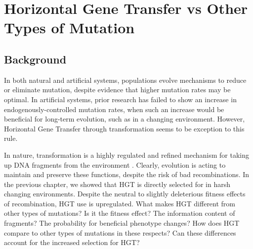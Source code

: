 \documentclass[PhD]{msu-thesis}
\begin{document}
\chapter{Horizontal Gene Transfer vs Other Types of Mutation}
\label{chap:hgt-preferred}
\section{Background}

In both natural and artificial systems, populations evolve mechanisms to reduce or eliminate mutation\cite{wielgoss_mutation_2013}, despite evidence that higher mutation rates may be optimal\cite{clune_natural_2008}.
In artificial systems, prior research has failed to show an increase in endogenously-controlled mutation rates, when such an increase would be beneficial for long-term evolution, such as in a changing environment\cite{clune_natural_2008}. However, Horizontal Gene Transfer through transformation seems to be exception to this rule.  

In nature, transformation is a highly regulated and refined mechanism for taking up DNA fragments from the environment \cite{solomon_whos_1996,seitz_cues_2013,fontaine_novel_2010}. 
Clearly, evolution
is acting to maintain and preserve these functions, despite the risk of bad recombinations. In the previous chapter, we showed that HGT is directly selected for in harsh changing environments. Despite the neutral to slightly deleterious fitness effects of recombination, HGT use is upregulated.
What makes HGT different from other types of mutations?
Is it the fitness effect? The information content of fragments? The probability for beneficial phenotype changes? 
How does HGT compare to other types of mutations in these respects?
Can these differences account for the increased selection for HGT? 
\end{document}
